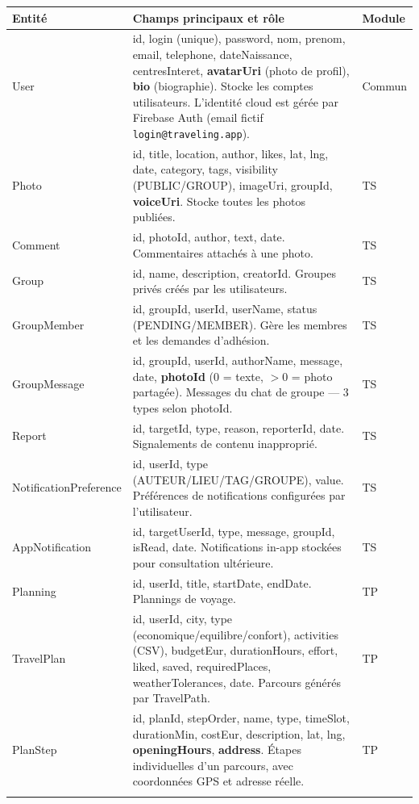 \documentclass[a4paper,12pt,openany]{report}
\newcommand{\ic}[1]{\texttt{\small\colorbox{lightbg}{\color{navy!90} #1}}}
\begin{document}
\begin{longtable}{>{\ttfamily\small}l >{\small}p{6.5cm} >{\centering\small}p{1.8cm}}
  \toprule
  \normalfont\textbf{Entité} & \textbf{Champs principaux et rôle} & \textbf{Module} \\
  \midrule
  \endhead
  User
    & id, login (unique), password, nom, prenom, email,
      telephone, dateNaissance, centresInteret,
      \textbf{avatarUri} (photo de profil), \textbf{bio} (biographie).
      Stocke les comptes utilisateurs. L'identité cloud est gérée
      par Firebase Auth (email fictif \ic{login@traveling.app}).
    & Commun \\
  Photo
    & id, title, location, author, likes, lat, lng, date,
      category, tags, visibility (PUBLIC/GROUP), imageUri,
      groupId, \textbf{voiceUri}.
      Stocke toutes les photos publiées.
    & TS \\
  Comment
    & id, photoId, author, text, date.
      Commentaires attachés à une photo.
    & TS \\
  Group
    & id, name, description, creatorId.
      Groupes privés créés par les utilisateurs.
    & TS \\
  GroupMember
    & id, groupId, userId, userName, status (PENDING/MEMBER).
      Gère les membres et les demandes d'adhésion.
    & TS \\
  GroupMessage
    & id, groupId, userId, authorName, message, date,
      \textbf{photoId} (0 = texte, $>$0 = photo partagée).
      Messages du chat de groupe — 3 types selon photoId.
    & TS \\
  Report
    & id, targetId, type, reason, reporterId, date.
      Signalements de contenu inapproprié.
    & TS \\
  NotificationPreference
    & id, userId, type (AUTEUR/LIEU/TAG/GROUPE), value.
      Préférences de notifications configurées par l'utilisateur.
    & TS \\
  AppNotification
    & id, targetUserId, type, message, groupId, isRead, date.
      Notifications in-app stockées pour consultation ultérieure.
    & TS \\
  Planning
    & id, userId, title, startDate, endDate.
      Plannings de voyage.
    & TP \\
  TravelPlan
    & id, userId, city, type (economique/equilibre/confort),
      activities (CSV), budgetEur, durationHours, effort,
      liked, saved, requiredPlaces, weatherTolerances, date.
      Parcours générés par TravelPath.
    & TP \\
  PlanStep
    & id, planId, stepOrder, name, type, timeSlot, durationMin,
      costEur, description, lat, lng, \textbf{openingHours}, \textbf{address}.
      Étapes individuelles d'un parcours, avec coordonnées GPS et adresse réelle.
    & TP \\
  \bottomrule
  \multicolumn{3}{l}{\small TS = TravelShare \quad TP = TravelPath}
\end{longtable}
\end{document}
